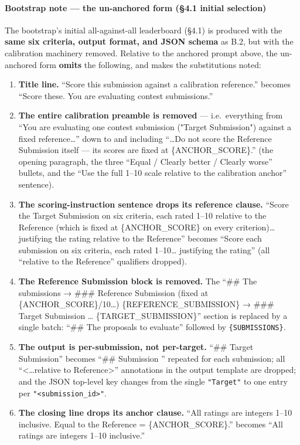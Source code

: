 \paragraph{Bootstrap note --- the un-anchored form (§4.1 initial selection)}\label{bootstrap-note-the-un-anchored-form-4.1-initial-selection}

The bootstrap's initial all-against-all leaderboard (§4.1) is produced with the \textbf{same six criteria, output format, and JSON schema} as B.2, but with the calibration machinery removed. Relative to the anchored prompt above, the un-anchored form \textbf{omits} the following, and makes the substitutions noted:

\begin{enumerate}
\def\labelenumi{\arabic{enumi}.}
\tightlist
\item
  \textbf{Title line.} ``Score this submission against a calibration reference.'' becomes ``Score these. You are evaluating contest submissions.''
\item
  \textbf{The entire calibration preamble is removed} --- i.e.~everything from ``You are evaluating one contest submission ("Target Submission") against a fixed reference\ldots{}'' down to and including ``\ldots Do not score the Reference Submission itself --- its scores are fixed at \{ANCHOR\_SCORE\}.'' (the opening paragraph, the three ``Equal / Clearly better / Clearly worse'' bullets, and the ``Use the full 1--10 scale relative to the calibration anchor'' sentence).
\item
  \textbf{The scoring-instruction sentence drops its reference clause.} ``Score the Target Submission on six criteria, each rated 1--10 relative to the Reference (which is fixed at \{ANCHOR\_SCORE\} on every criterion)\ldots{} justifying the rating relative to the Reference'' becomes ``Score each submission on six criteria, each rated 1--10\ldots{} justifying the rating'' (all ``relative to the Reference'' qualifiers dropped).
\item
  \textbf{The Reference Submission block is removed.} The ``\#\# The submissions → \#\#\# Reference Submission (fixed at \{ANCHOR\_SCORE\}/10\ldots) \{REFERENCE\_SUBMISSION\} → \#\#\# Target Submission \ldots{} \{TARGET\_SUBMISSION\}'' section is replaced by a single batch: ``\#\# The proposals to evaluate'' followed by \texttt{\{SUBMISSIONS\}}.
\item
  \textbf{The output is per-submission, not per-target.} ``\#\# Target Submission'' becomes ``\#\# Submission '' repeated for each submission; all ``\textless\ldots relative to Reference\textgreater{}'' annotations in the output template are dropped; and the JSON top-level key changes from the single \texttt{"Target"} to one entry per \texttt{"\textless{}submission\_id\textgreater{}"}.
\item
  \textbf{The closing line drops its anchor clause.} ``All ratings are integers 1--10 inclusive. Equal to the Reference = \{ANCHOR\_SCORE\}.'' becomes ``All ratings are integers 1--10 inclusive.''
\end{enumerate}

